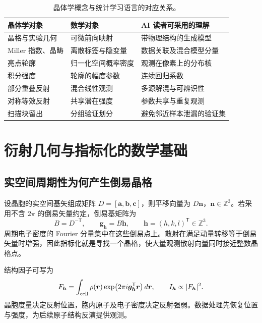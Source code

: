 \documentclass[UTF8,11pt,a4paper,fontset=fandol]{ctexart}
\newcommand{\T}{\mathsf{T}}
\begin{document}
\begin{table}[htbp]
\centering\small
\caption{晶体学概念与统计学习语言的对应关系。}
\begin{tabularx}{\linewidth}{@{}lXX@{}}\toprule
晶体学对象 & 数学对象 & AI 读者可采用的理解 \\\midrule
晶格与实验几何 & 可微前向映射 & 带物理结构的生成模型 \\
Miller 指数、晶畴 & 离散标签与隐变量 & 数据关联及混合模型分量 \\
亮点轮廓 & 归一化空间概率密度 & 观测在像素上的分布核 \\
积分强度 & 轮廓的幅度参数 & 连续回归系数 \\
部分重叠反射 & 混合线性观测 & 多源解混与可辨识性 \\
对称等效反射 & 共享潜在强度 & 参数共享与重复观测 \\
扫描块留出 & 分组验证划分 & 避免邻近样本泄漏的验证集 \\\bottomrule
\end{tabularx}
\end{table}

\section{衍射几何与指标化的数学基础}
\subsection{实空间周期性为何产生倒易晶格}
设晶胞的实空间基矢组成矩阵 $D=[\bm a,\bm b,\bm c]$，则平移向量为 $D\bm n$，$\bm n\in\mathbb Z^3$。若采用不含 $2\pi$ 的倒易矢量约定，倒易基矩阵为
\begin{equation}
B=D^{-\T},\qquad \bm g_{\bm h}=B\bm h,\qquad \bm h=(h,k,l)^\T\in\mathbb Z^3.
\end{equation}
周期电子密度的 Fourier 分量集中在这些倒易点上。散射在满足动量转移等于倒易矢量时增强，因此指标化就是寻找一个晶格，使大量观测散射向量同时接近整数晶格点。

结构因子可写为
\begin{equation}
F_{\bm h}=\int_{\rm cell}\rho(\bm r)
\exp\!\left(2\pi i\bm g_{\bm h}^{\T}\bm r\right)d\bm r,
\qquad I_{\bm h}\propto |F_{\bm h}|^2.
\end{equation}
晶胞度量决定反射位置，胞内原子及电子密度决定反射强弱。数据处理先恢复位置与强度，为后续原子结构反演提供观测。
\end{document}

